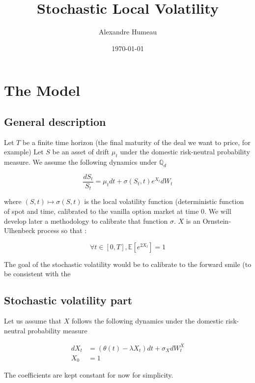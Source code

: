 \documentclass{article}
\begin{document}
\title{Stochastic Local Volatility}
\author{Alexandre Humeau}
\date{\today}
\maketitle

\section{The Model}
\subsection{General description}
Let $T$ be a finite time horizon (the final maturity of the deal we want to price, for example)
Let $S$ be an asset of drift $\mu_t$ under the domestic risk-neutral probability measure. We assume the following dynamics under $\mathbb{Q}_d$

\begin{equation}
	\frac{dS_t}{S_t} = \mu_t dt + \sigma(S_t,t) e^{X_t} dW_t
\end{equation}

\noindent where $(S,t) \mapsto \sigma(S,t)$ is the local volatility function (deterministic function of spot and time, calibrated to the vanilla option market at time $0$. We will develop later a methodology to calibrate that function $\sigma$. $X$ is an Ornstein-Ulhenbeck process so that : 

\begin{equation}
	\forall t \in [0,T], \mathbb{E}\left[e^{2X_t}\right] = 1
\end{equation}

\noindent The goal of the stochastic volatility would be to calibrate to the forward smile (to be consistent with the 

\subsection{Stochastic volatility part}
Let us assume that $X$ follows the following dynamics under the domestic risk-neutral probability measure

\begin{equation}
\begin{aligned}
	dX_t &= (\theta(t) - \lambda X_t) dt + \sigma_X dW_t^X\\
	X_0 &= 1
\end{aligned}
\end{equation}

\noindent The coefficients are kept constant for now for simplicity.
\end{document}
